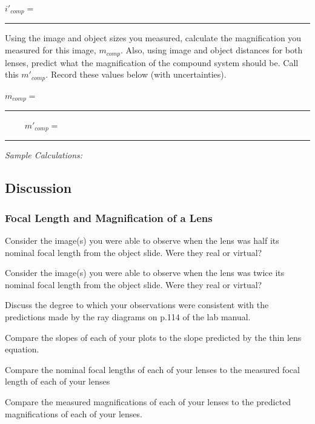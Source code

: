 \begin{center}
$i'_{comp}=$~\rule{3cm}{.1mm}
\end{center}
\vspace*{.5cm}

\noindent
Using the image and object sizes you measured, calculate the magnification 
you measured for this image, $m_{comp}.$ Also, using image and object
distances for both lenses, predict what the magnification of the compound
system should be. Call this $m'_{comp}.$ 
Record these values below (with uncertainties).

\begin{center}
$m_{comp}=$~\rule{3cm}{.1mm} ~~~~
$m'_{comp}=$~\rule{3cm}{.1mm}
\end{center}
{\it Sample Calculations:}
\newpage

\subsection{Discussion}
\subsubsection{Focal Length and Magnification of a Lens}
Consider the image(s) you were able to observe when the lens was half its
nominal focal length from the object slide. Were they real or virtual?
\vspace*{.3cm}

\noindent
Consider the image(s) you were able to observe when the lens was twice its
nominal focal length from the object slide. Were they real or virtual?
\vspace*{.3cm}

\noindent
Discuss the degree to which your observations were consistent with the
predictions made by the ray diagrams on p.114 of the lab manual.
\vspace*{2cm}

\noindent
Compare the slopes of each of your plots to the slope predicted by the thin lens
equation.
\vspace*{1.4cm}

\noindent 
Compare the nominal focal lengths of each of your lenses to the measured focal
length of each of your lenses 
\vspace*{1.4cm}

\noindent
Compare the measured magnifications of each of your lenses to the predicted
magnifications of each of your lenses. 
\vspace*{1.4cm}


